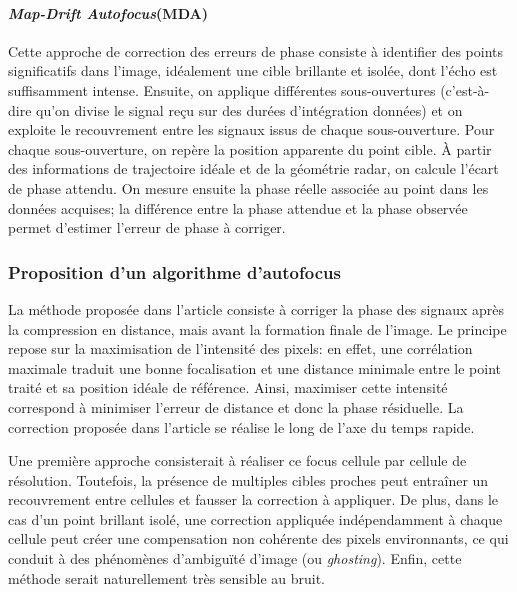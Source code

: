 \paragraph{ \textit{Map-Drift Autofocus}(MDA)}
Cette approche de correction des erreurs de phase consiste à identifier des points significatifs dans l’image, idéalement une cible brillante et isolée, dont l’écho est suffisamment intense. Ensuite, on applique différentes sous-ouvertures (c’est-à-dire qu’on divise le signal reçu sur des durées d’intégration données) et on exploite le recouvrement entre les signaux issus de chaque sous-ouverture. Pour chaque sous-ouverture, on repère la position apparente du point cible. À partir des informations de trajectoire idéale et de la géométrie radar, on calcule l’écart de phase attendu. On mesure ensuite la phase réelle associée au point dans les données acquises; la différence entre la phase attendue et la phase observée permet d’estimer l’erreur de phase à corriger.

\subsubsection{Proposition d'un algorithme d'autofocus}
La méthode proposée dans l'article \cite{autofocus} consiste à corriger la phase des signaux après la compression en distance, mais avant la formation finale de l’image. Le principe repose sur la maximisation de l’intensité des pixels: en effet, une corrélation maximale traduit une bonne focalisation et une distance minimale entre le point traité et sa position idéale de référence. Ainsi, maximiser cette intensité correspond à minimiser l’erreur de distance et donc la phase résiduelle. La correction proposée dans l’article se réalise le long de l’axe du temps rapide.

Une première approche consisterait à réaliser ce focus cellule par cellule de résolution. Toutefois, la présence de multiples cibles proches peut entraîner un recouvrement entre cellules et fausser la correction à appliquer. De plus, dans le cas d’un point brillant isolé, une correction appliquée indépendamment à chaque cellule peut créer une compensation non cohérente des pixels environnants, ce qui conduit à des phénomènes d’ambiguïté d’image (ou \textit{ghosting}). Enfin, cette méthode serait naturellement très sensible au bruit.

